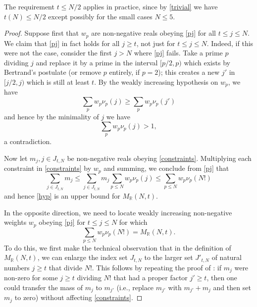 \documentclass[10pt,a4paper,reqno]{amsart}
\numberwithin{equation}{section}
\theoremstyle{plain}
\theoremstyle{definition}
\newcommand\R{\mathbb{R}}
\begin{document}
The requirement $t \leq N/2$ applies in practice, since by \eqref{trivial} we have $t(N) \leq N/2$ except possibly for the small cases $N \leq 5$.

\begin{proof}  Suppose first that $w_p$ are non-negative reals obeying \eqref{pj} for all $t \leq j \leq N$.
We claim that \eqref{pj} in fact holds for all $j \geq t$, not just for $t \leq j \leq N$.  Indeed, if this were not the case, consider the first $j > N$ where \eqref{pj} fails.  Take a prime $p$ dividing $j$ and replace it by a prime in the interval $[p/2,p)$ which exists by Bertrand's postulate (or remove $p$ entirely, if $p=2$); this creates a new $j'$ in $[j/2,j)$ which is still at least $t$.  By the weakly increasing hypothesis on $w_p$, we have
  $$ \sum_p w_p \nu_p(j) \geq \sum_p w_p \nu_p(j')$$
  and hence by the minimality of $j$ we have
  $$ \sum_p w_p \nu_p(j) > 1,$$
  a contradiction.

Now let $m_j, j \in J_{t,N}$ be non-negative reals obeying \eqref{constraints}.  Multiplying each constraint in \eqref{constraints} by $w_p$ and summing, we conclude from \eqref{pj} that
$$ \sum_{j \in J_{t,N}} m_j  \leq \sum_{j \in J_{t,N}} m_j \sum_{p \leq N} w_p \nu_p(j) \leq \sum_{p \leq N} w_p \nu_p(N!)$$
and hence \eqref{hyp} is an upper bound for $M_\R(N,t)$.

In the opposite direction, we need to locate weakly increasing non-negative weights $w_p$ obeying \eqref{pj} for $t \leq j \leq N$ for which
\begin{equation}\label{wpm}
  \sum_{p \leq N} w_p \nu_p(N!) = M_\R(N,t).
\end{equation}
To do this, we first make the technical observation that in the definition of $M_\R(N,t)$, we can enlarge the index set $J_{t,N}$ to the larger set $J'_{t,N}$ of natural numbers $j \geq t$ that divide $N!$.  This follows by repeating the proof of : if $m_j$ were non-zero for some $j \geq t$ dividing $N!$ that had a proper factor $j' \geq t$, then one could transfer the mass of $m_j$ to $m_{j'}$ (i.e., replace $m_{j'}$ with $m_{j'}+m_j$ and then set $m_j$ to zero) without affecting \eqref{constraints}.


\end{proof}
\end{document}
